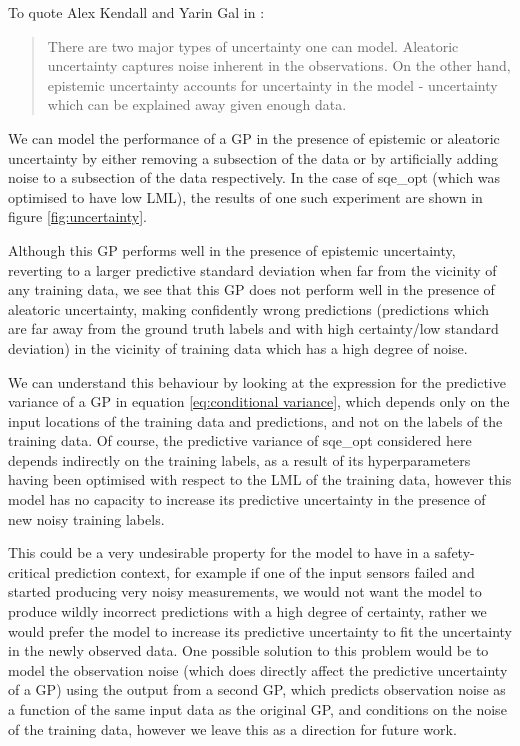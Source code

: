 To quote Alex Kendall and Yarin Gal in \cite{kendall2017uncertainties}:

\begin{quote}
    There are two major types of uncertainty one can model. Aleatoric uncertainty captures noise inherent in the observations. On the other hand, epistemic uncertainty accounts for uncertainty in the model - uncertainty which can be explained away given enough data.
\end{quote}

We can model the performance of a GP in the presence of epistemic or aleatoric uncertainty by either removing a subsection of the data or by artificially adding noise to a subsection of the data respectively. In the case of sqe\_opt (which was optimised to have low LML), the results of one such experiment are shown in figure \ref{fig:uncertainty}.

Although this GP performs well in the presence of epistemic uncertainty, reverting to a larger predictive standard deviation when far from the vicinity of any training data, we see that this GP does not perform well in the presence of aleatoric uncertainty, making confidently wrong predictions (predictions which are far away from the ground truth labels and with high certainty/low standard deviation) in the vicinity of training data which has a high degree of noise.

We can understand this behaviour by looking at the expression for the predictive variance of a GP in equation \ref{eq:conditional variance}, which depends only on the input locations of the training data and predictions, and not on the labels of the training data. Of course, the predictive variance of sqe\_opt considered here depends indirectly on the training labels, as a result of its hyperparameters having been optimised with respect to the LML of the training data, however this model has no capacity to increase its predictive uncertainty in the presence of new noisy training labels.

This could be a very undesirable property for the model to have in a safety-critical prediction context, for example if one of the input sensors failed and started producing very noisy measurements, we would not want the model to produce wildly incorrect predictions with a high degree of certainty, rather we would prefer the model to increase its predictive uncertainty to fit the uncertainty in the newly observed data. One possible solution to this problem would be to model the observation noise (which does directly affect the predictive uncertainty of a GP) using the output from a second GP, which predicts observation noise as a function of the same input data as the original GP, and conditions on the noise of the training data, however we leave this as a direction for future work.
